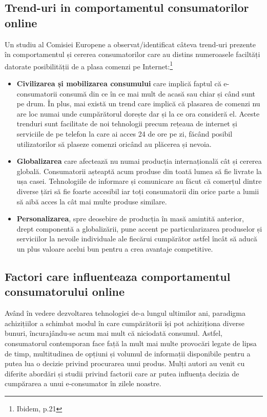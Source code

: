 \documentclass[a4paper, 12pt]{article}
\begin{document}
		\subsection{Trend-uri in comportamentul consumatorilor online} 
		\quad Un studiu al Comisiei Europene a observat/identificat câteva trend-uri prezente în comportamentul și cererea consumatorilor care au distins numeroasele faciltăți datorate posibilității de a plasa comenzi pe Internet:\footnote{Ibidem, p.21}
		\begin{itemize}
			\item \textbf{Civilizarea și mobilizarea consumului} care implică faptul că e-consumatorii consumă din ce în ce mai mult de acasă sau chiar și când sunt pe drum. În plus, mai există un trend care implică că plasarea de comenzi nu are loc numai unde cumpărătorul dorește dar și la ce ora consideră el. Aceste trenduri sunt facilitate de noi tehnologii precum rețeaua de internet și serviciile de pe telefon la care ai acces 24 de ore pe zi, făcând posibil utilizatorilor să plaseze comenzi oricând au plăcerea și nevoia.
			\item \textbf{Globalizarea} care afectează nu numai producția internațională cât și cererea globală. Consumatorii așteaptă acum produse din toată lumea să fie livrate la ușa casei. Tehnologiile de informare și comunicare au făcut că comerțul dintre diverse țări să fie foarte accesibil iar toți consumatorii din orice parte a lumii să aibă acces la cât mai multe produse similare.
			\item \textbf{Personalizarea}, spre deosebire de producția în masă amintită anterior, drept componentă a globalizării, pune accent pe particularizarea produselor și serviciilor la nevoile individuale ale fiecărui cumpărător astfel încât să aducă un plus valoare acelui bun pentru a crea avantaje competitive.
		\end{itemize}
		\subsection{Factori care influenteaza comportamentul consumatorului online}
	\qquad\space Având în vedere dezvoltarea tehnologiei de-a lungul ultimilor ani,  paradigma achizițiilor a schimbat modul în care cumpărătorii își pot achiziționa diverse bunuri, încurajându-se acum mai mult că niciodată consumul. Astfel, consumatorul contemporan face față la mult mai multe provocări legate de lipsa de timp, multitudinea de opțiuni și volumul de informații disponibile pentru a putea lua o decizie privind procurarea unui produs. Mulți autori au venit cu diferite abordări și studii privind factorii care ar putea influența decizia de cumpărarea a unui e-consumator în zilele noastre.
	
\end{document}
